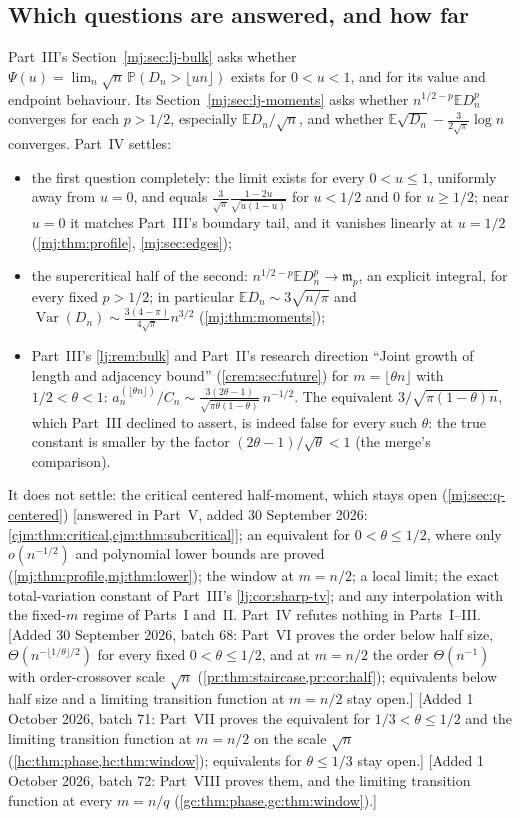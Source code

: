 \documentclass[11pt,a4paper]{article}
\theoremstyle{definition}\newaliascnt{definition}{theorem}
\theoremstyle{remark}\newaliascnt{remark}{theorem}
\newcommand{\ljP}{\mathbb P}
\newcommand{\ljE}{\mathbb E}
\newcommand{\mjVar}{\operatorname{Var}}
\begin{document}
\subsection{Which questions are answered, and how far}
\label{mj:sec:scope}
Part~III's Section~\ref{mj:sec:lj-bulk} asks whether
$\Psi(u)=\lim_n\sqrt n\,\ljP(D_n>\lfloor un\rfloor)$ exists for $0<u<1$,
and for its value and endpoint behaviour. Its
Section~\ref{mj:sec:lj-moments} asks whether $n^{1/2-p}\ljE D_n^p$ converges
for each $p>1/2$, especially $\ljE D_n/\sqrt n$, and whether
$\ljE\sqrt{D_n}-\frac3{2\sqrt\pi}\log n$ converges. Part~IV settles:
\begin{itemize}
\item the first question completely: the limit exists for every
 $0<u\le1$, uniformly away from $u=0$, and equals
 $\frac3{\sqrt\pi}\frac{1-2u}{\sqrt{u(1-u)}}$ for $u<1/2$ and $0$ for
 $u\ge1/2$; near $u=0$ it matches Part~III's boundary tail, and it vanishes
 linearly at $u=1/2$ (\cref{mj:thm:profile}, \cref{mj:sec:edges});
\item the supercritical half of the second: $n^{1/2-p}\ljE D_n^p\to\mathfrak
 m_p$, an explicit integral, for every fixed $p>1/2$; in particular
 $\ljE D_n\sim3\sqrt{n/\pi}$ and
 $\mjVar(D_n)\sim\frac{3(4-\pi)}{4\sqrt\pi}n^{3/2}$
 (\cref{mj:thm:moments});
\item Part~III's \cref{lj:rem:bulk} and Part~II's research direction
 ``Joint growth of length and adjacency bound'' (\cref{crem:sec:future}) for
 $m=\lfloor\theta n\rfloor$ with $1/2<\theta<1$:
 $a_n^{(\lfloor\theta n\rfloor)}/C_n\sim
 \frac{3(2\theta-1)}{\sqrt{\pi\theta(1-\theta)}}\,n^{-1/2}$. The equivalent
 $3/\sqrt{\pi(1-\theta)n}$, which Part~III declined to assert, is indeed
 false for every such $\theta$: the true constant is smaller by the factor
 $(2\theta-1)/\sqrt\theta<1$ (the merge's comparison).
\end{itemize}
It does not settle: the critical centered half-moment, which stays open
(\cref{mj:sec:q-centered}) [answered in Part~V, added 30 September 2026:
\cref{cjm:thm:critical,cjm:thm:subcritical}]; an equivalent for $0<\theta\le1/2$, where only
$o(n^{-1/2})$ and polynomial lower bounds are proved
(\cref{mj:thm:profile,mj:thm:lower}); the window at $m=n/2$; a local limit;
the exact total-variation constant of Part~III's
\cref{lj:cor:sharp-tv}; and any interpolation with the fixed-$m$ regime of
Parts~I and~II. Part~IV refutes nothing in Parts~I--III.
[Added 30 September 2026, batch 68: Part~VI proves the order below half
size, $\Theta(n^{-\lfloor1/\theta\rfloor/2})$ for every fixed
$0<\theta\le1/2$, and at $m=n/2$ the order $\Theta(n^{-1})$ with
order-crossover scale $\sqrt n$ (\cref{pr:thm:staircase,pr:cor:half});
equivalents below half size and a limiting transition function at $m=n/2$
stay open.]
[Added 1 October 2026, batch 71: Part~VII proves the equivalent for
$1/3<\theta\le1/2$ and the limiting transition function at $m=n/2$ on the
scale $\sqrt n$ (\cref{hc:thm:phase,hc:thm:window}); equivalents for
$\theta\le1/3$ stay open.]
[Added 1 October 2026, batch 72: Part~VIII proves them, and the limiting
transition function at every $m=n/q$ (\cref{gc:thm:phase,gc:thm:window}).]
\end{document}

